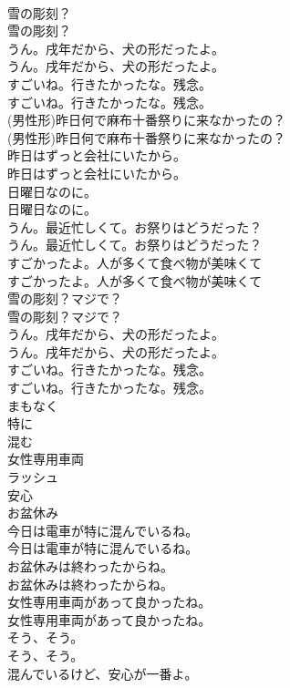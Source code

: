 \documentclass[8pt]{extreport}
\begin{document}
\begin{CJK}{UTF8}{min}
\\	雪の彫刻？	
\\	雪の彫刻？ 
\\	うん。戌年だから、犬の形だったよ。	
\\	うん。戌年だから、犬の形だったよ。 
\\	すごいね。行きたかったな。残念。	
\\	すごいね。行きたかったな。残念。 
\\	(男性形)昨日何で麻布十番祭りに来なかったの？	
\\	(男性形)昨日何で麻布十番祭りに来なかったの？ 
\\	昨日はずっと会社にいたから。	
\\	昨日はずっと会社にいたから。 
\\	日曜日なのに。	
\\	日曜日なのに。 
\\	うん。最近忙しくて。お祭りはどうだった？	
\\	うん。最近忙しくて。お祭りはどうだった？ 
\\	すごかったよ。人が多くて食べ物が美味くて	
\\	すごかったよ。人が多くて食べ物が美味くて 
\\	雪の彫刻？マジで？	
\\	雪の彫刻？マジで？ 
\\	うん。戌年だから、犬の形だったよ。	
\\	うん。戌年だから、犬の形だったよ。 
\\	すごいね。行きたかったな。残念。	
\\	すごいね。行きたかったな。残念。 
\\	まもなく
\\	特に
\\	混む
\\	女性専用車両
\\	ラッシュ
\\	安心
\\	お盆休み
\\	今日は電車が特に混んでいるね。	
\\	今日は電車が特に混んでいるね。 
\\	お盆休みは終わったからね。	
\\	お盆休みは終わったからね。 
\\	女性専用車両があって良かったね。	
\\	女性専用車両があって良かったね。 
\\	そう、そう。	
\\	そう、そう。 
\\	混んでいるけど、安心が一番よ。	

\end{CJK}
\end{document}
